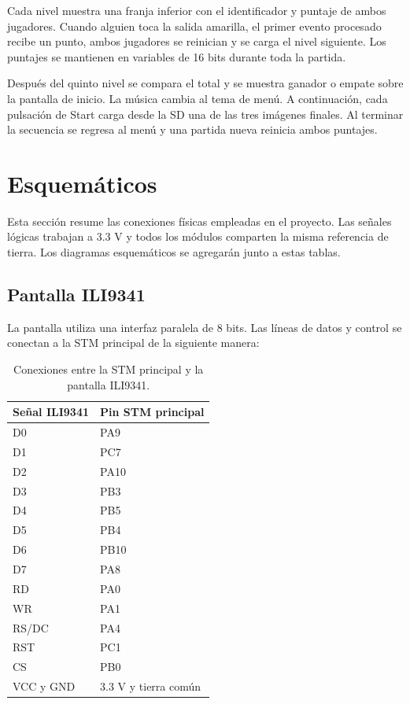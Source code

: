 \documentclass[11pt,letterpaper]{article}
\begin{document}
Cada nivel muestra una franja inferior con el identificador y puntaje de ambos
jugadores. Cuando alguien toca la salida amarilla, el primer evento procesado recibe
un punto, ambos jugadores se reinician y se carga el nivel siguiente. Los puntajes se
mantienen en variables de 16 bits durante toda la partida.

Después del quinto nivel se compara el total y se muestra ganador o empate sobre la
pantalla de inicio. La música cambia al tema de menú. A continuación, cada pulsación
de Start carga desde la SD una de las tres imágenes finales. Al terminar la secuencia
se regresa al menú y una partida nueva reinicia ambos puntajes.

\section{Esquemáticos}

Esta sección resume las conexiones físicas empleadas en el proyecto. Las señales
lógicas trabajan a 3.3 V y todos los módulos comparten la misma referencia de
tierra. Los diagramas esquemáticos se agregarán junto a estas tablas.

\subsection{Pantalla ILI9341}

La pantalla utiliza una interfaz paralela de 8 bits. Las líneas de datos y control
se conectan a la STM principal de la siguiente manera:

\begin{table}[htbp]
\centering
\small
\caption{Conexiones entre la STM principal y la pantalla ILI9341.}
\begin{tabularx}{0.78\textwidth}{@{}YY@{}}
\toprule
\textbf{Señal ILI9341} & \textbf{Pin STM principal} \\
\midrule
D0 & PA9 \\
D1 & PC7 \\
D2 & PA10 \\
D3 & PB3 \\
D4 & PB5 \\
D5 & PB4 \\
D6 & PB10 \\
D7 & PA8 \\
RD & PA0 \\
WR & PA1 \\
RS/DC & PA4 \\
RST & PC1 \\
CS & PB0 \\
VCC y GND & 3.3 V y tierra común \\
\bottomrule
\end{tabularx}
\end{table}
\end{document}
